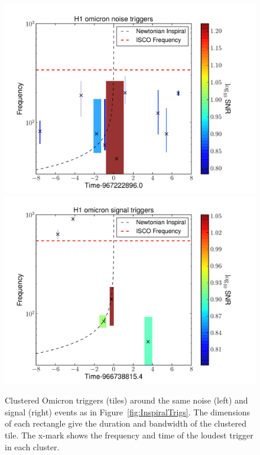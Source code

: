 \documentclass[a0,portrait]{a0poster}
\begin{document}
\begin{textblock}{8}
\begin{figure}
\hspace{-1cm}
{
  \includegraphics[scale=0.96]{images/H1-omicron-noise-trigs_POSTER.pdf}
  }
\hspace{-2cm}
{
  \includegraphics[scale=0.96]{images/H1-omicron-signal-trigs_POSTER.pdf}
  }
\vspace*{-1cm}
\caption{Clustered Omicron triggers (tiles) around the same noise (left) and signal (right) events as in Figure~\ref{fig:InspiralTrigs}. 
The dimensions of each rectangle give the duration and bandwidth of the clustered tile. The x-mark shows the frequency and time of the loudest trigger in each cluster.}
\label{fig:OmicronTrigs}
\end{figure}

\end{textblock}
\end{document}
